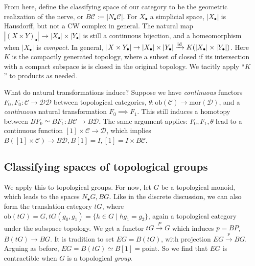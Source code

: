 From here, define the classifying space of our category to be the geometric realization of the nerve, or $B\mathcal{C} := |N_{\bullet}\mathcal{C} |$. For $X_{\bullet}$ a simplicial space, $|X_{\bullet}|$ is Hausdorff, but not a CW complex in general. The natural map $|(X \times Y)_{\bullet}| \to |X_{\bullet}| \times |Y_{\bullet}|$ is still a continuous bijection, and a homeomorphism when $|X_{\bullet}|$ is \emph{compact}. In general, $|X \times Y_{\bullet}| \to |X_{\bullet}| \times |Y_{\bullet}| \xrightarrow{\operatorname{id}} K(|X_{\bullet}| \times |Y_{\bullet}|)$. Here $K$ is the compactly generated topology, where a subset of closed if its intersection with a compact subspace is is closed in the original topology. We tacitly apply ``$K$'' to products as needed.

What do natural transformations induce? Suppose we have \emph{continuous} functors $F_0,F_0 \colon \mathcal{C}  \to \mathcal{DD} $ between topological categories, $\theta \colon \mathrm{ob}(\mathcal{C} ) \to \mathrm{mor}(\mathcal{D} )$, and a \emph{continuous} natural transformation $F_0 \implies F_1$. This still induces a homotopy between $BF_0 \simeq  BF_1 \colon B\mathcal{C}  \to B\mathcal{D} $. The same argument applies: $F_0,F_1, \theta$ lead to a continuous function $[1] \times \mathcal{C} \to \mathcal{D} $, which implies $B([1] \times \mathcal{C} ) \to B\mathcal{D} ,B[1]=I, [1]=I \times B\mathcal{C} $. 

\subsection{Classifying spaces of topological groups}
We apply this to topological groups. For now, let $G$ be a topological monoid, which leads to the spaces $N_{\bullet}G,BG$. Like in the discrete discussion, we can also form the translation category $tG$, where $\mathrm{ob}(tG)=G, tG(g_0,g_1)= \{h \in G \mid hg_1=g_2\} $, again a topological category under the subspace topology. We get a functor $tG\xrightarrow P G$ which induces $p=BP$, $B(tG) \to BG$. It is tradition to set $EG=B(tG)$, with projection $EG \xrightarrow pBG$. Arguing as before, $EG= B(tG) \simeq  B[1] = \text{point} $. So we find that $EG$ is contractible when $G$ is a topological \emph{group}.

